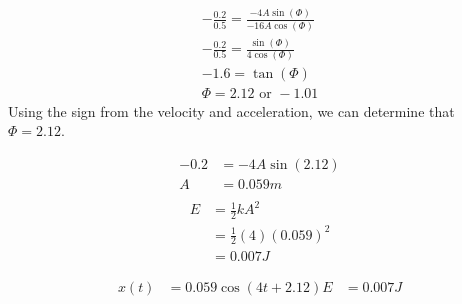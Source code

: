 \documentclass{article}
\theoremstyle{mytheoremstyle}
\theoremstyle{mytheoremstyle}
\theoremstyle{myproblemstyle}
\begin{document}
    \begin{align*}
        -\frac{0.2}{0.5} = \frac{-4A\sin(\Phi)}{-16A\cos(\Phi)} \\
        -\frac{0.2}{0.5} = \frac{\sin(\Phi)}{4\cos(\Phi)} \\
        -1.6 = \tan(\Phi) \\
        \Phi = 2.12 \text{ or } -1.01
    \end{align*}
    Using the sign from the velocity and acceleration, we can determine that
    $\Phi=2.12$.

    \begin{align*}
        -0.2 &= -4A\sin(2.12) \\
        A &= 0.059 m \\
    \end{align*}
    \begin{align*}
        E &= \frac{1}{2} kA^2 \\
        &= \frac{1}{2} (4)(0.059)^2 \\
        &= 0.007 J
    \end{align*}

    \begin{align*}
        x(t) &= 0.059\cos(4t + 2.12)
        E &= 0.007 J
    \end{align*}
\end{document}
